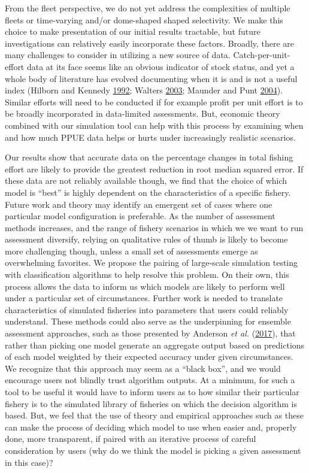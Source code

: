 \documentclass[twoside,12pt,final]{ucthesis-CA2012}
\begin{document}
\begin{ucmainmatter}
From the fleet perspective, we do not yet address the complexities of
multiple fleets or time-varying and/or dome-shaped shaped selectivity.
We make this choice to make presentation of our initial results
tractable, but future investigations can relatively easily incorporate
these factors. Broadly, there are many challenges to consider in
utilizing a new source of data. Catch-per-unit-effort data at its face
seems like an obvious indicator of stock status, and yet a whole body of
literature has evolved documenting when it is and is not a useful index
(Hilborn and Kennedy \protect\hyperlink{ref-Hilborn1992a}{1992}; Walters
\protect\hyperlink{ref-Walters2003}{2003}; Maunder and Punt
\protect\hyperlink{ref-Maunder2004}{2004}). Similar efforts will need to
be conducted if for example profit per unit effort is to be broadly
incorporated in data-limited assessments. But, economic theory combined
with our simulation tool can help with this process by examining when
and how much PPUE data helps or hurts under increasingly realistic
scenarios.

Our results show that accurate data on the percentage changes in total
fishing effort are likely to provide the greatest reduction in root
median squared error. If these data are not reliably available though,
we find that the choice of which model is ``best'' is highly dependent
on the characteristics of a specific fishery. Future work and theory may
identify an emergent set of cases where one particular model
configuration is preferable. As the number of assessment methods
increases, and the range of fishery scenarios in which we we want to run
assessment diversify, relying on qualitative rules of thumb is likely to
become more challenging though, unless a small set of assessments emerge
as overwhelming favorites. We propose the pairing of large-scale
simulation testing with classification algorithms to help resolve this
problem. On their own, this process allows the data to inform us which
models are likely to perform well under a particular set of
circumstances. Further work is needed to translate characteristics of
simulated fisheries into parameters that users could reliably
understand. These methods could also serve as the underpinning for
ensemble assessment approaches, such as those presented by Anderson
\emph{et al.} (\protect\hyperlink{ref-Anderson2017b}{2017}), that rather
than picking one model generate an aggregate output based on predictions
of each model weighted by their expected accuracy under given
circumstances. We recognize that this approach may seem as a ``black
box'', and we would encourage users not blindly trust algorithm outputs.
At a minimum, for such a tool to be useful it would have to inform users
as to how similar their particular fishery is to the simulated library
of fisheries on which the decision algorithm is based. But, we feel that
the use of theory and empirical approaches such as these can make the
process of deciding which model to use when easier and, properly done,
more transparent, if paired with an iterative process of careful
consideration by users (why do we think the model is picking a given
assessment in this case)?


\end{ucmainmatter}
\end{document}
